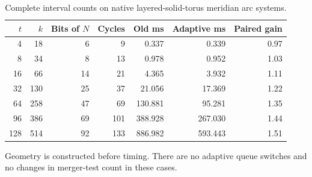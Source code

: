 \begin{table}[htbp]
\centering
\small
\begin{tabular}{rrrrrrr}
\toprule
$t$ & $k$ & Bits of $N$ & Cycles & Old ms & Adaptive ms & Paired gain \\
\midrule
4 & 18 & 6 & 9 & 0.337 & 0.339 & 0.97 \\
8 & 34 & 8 & 13 & 0.978 & 0.952 & 1.03 \\
16 & 66 & 14 & 21 & 4.365 & 3.932 & 1.11 \\
32 & 130 & 25 & 37 & 21.056 & 17.369 & 1.22 \\
64 & 258 & 47 & 69 & 130.881 & 95.281 & 1.35 \\
96 & 386 & 69 & 101 & 388.928 & 267.030 & 1.44 \\
128 & 514 & 92 & 133 & 886.982 & 593.443 & 1.51 \\
\bottomrule
\end{tabular}
\caption{Complete interval counts on native layered-solid-torus meridian arc systems.}
\label{tab:native}
\par\smallskip\footnotesize Geometry is constructed before timing. There are no adaptive queue switches and no changes in merger-test count in these cases.
\end{table}
